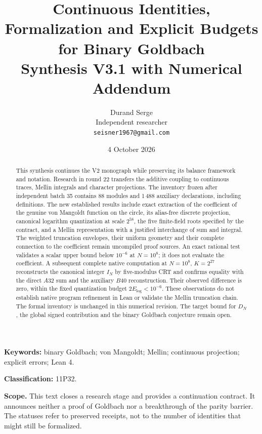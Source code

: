\documentclass[11pt,a4paper]{article}
\title{Continuous Identities, Formalization and Explicit Budgets\\
for Binary Goldbach\\[5pt]\large Synthesis V3.1 with Numerical Addendum}
\author{Durand Serge\\\small Independent researcher\\\small\texttt{seisner1967@gmail.com}}
\date{4 October 2026}
\theoremstyle{remark}
\begin{document}
\maketitle
\begin{abstract}
This synthesis continues the V2 monograph while preserving its balance
framework and notation. Research in round 22 transfers the additive coupling
to continuous traces, Mellin integrals and character projections.
The inventory frozen after independent batch 35 contains 88 modules and
1\,488 auxiliary declarations, including definitions. The new established
results include exact extraction of the coefficient of the genuine von
Mangoldt function on the circle, its alias-free discrete projection, canonical
logarithm quantization at scale $2^{58}$, the five finite-field roots specified
by the contract, and a Mellin representation with a justified interchange
of sum and integral. The weighted truncation envelopes, their uniform geometry
and their complete connection to the coefficient remain uncompiled proof
sources. An exact rational test validates a scalar upper bound below $10^{-6}$
at $N=10^8$; it does not evaluate the coefficient. A subsequent complete
native computation at $N=10^8$, $K=2^{27}$ reconstructs the canonical integer
$I_N$ by five-modulus CRT and confirms equality with the direct $A32$ sum
and the auxiliary $B40$ reconstruction. Their observed difference is zero,
within the fixed quantization budget $2E_{\log}<10^{-6}$. These observations
do not establish native program refinement in Lean or validate the Mellin
truncation chain. The formal inventory is unchanged in this numerical revision.
The target bound for $D_N$, the global signed contribution and the binary
Goldbach conjecture remain open.
\end{abstract}
\noindent\textbf{Keywords:} binary Goldbach; von Mangoldt; Mellin;
continuous projection; explicit errors; Lean 4.
\par\noindent\textbf{Classification:} 11P32.
\par\noindent\textbf{Scope.} This text closes a research stage and provides
a continuation contract. It announces neither a proof of Goldbach nor a
breakthrough of the parity barrier. The statuses refer to preserved receipts,
not to the number of identities that might still be formalized.
\par{}
\end{document}
